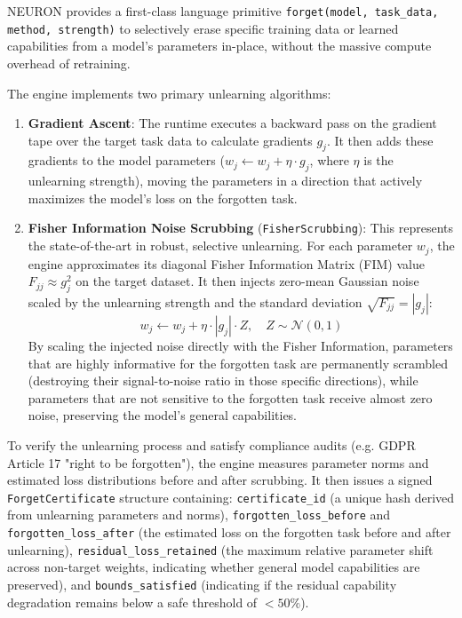\documentclass[11pt,a4paper]{article}
\begin{document}
NEURON provides a first-class language primitive \texttt{forget(model, task\_data, method, strength)} to selectively erase specific training data or learned capabilities from a model's parameters in-place, without the massive compute overhead of retraining.

The engine implements two primary unlearning algorithms:
\begin{enumerate}[itemsep=2pt]
  \item \textbf{Gradient Ascent}: The runtime executes a backward pass on the gradient tape over the target task data to calculate gradients $g_j$. It then adds these gradients to the model parameters ($w_j \leftarrow w_j + \eta \cdot g_j$, where $\eta$ is the unlearning strength), moving the parameters in a direction that actively maximizes the model's loss on the forgotten task.
  \item \textbf{Fisher Information Noise Scrubbing} (\texttt{FisherScrubbing}): This represents the state-of-the-art in robust, selective unlearning. For each parameter $w_j$, the engine approximates its diagonal Fisher Information Matrix (FIM) value $F_{jj} \approx g_j^2$ on the target dataset. It then injects zero-mean Gaussian noise scaled by the unlearning strength and the standard deviation $\sqrt{F_{jj}} = |g_j|$:
   $$w_j \leftarrow w_j + \eta \cdot |g_j| \cdot Z, \quad Z \sim \mathcal{N}(0, 1)$$
   By scaling the injected noise directly with the Fisher Information, parameters that are highly informative for the forgotten task are permanently scrambled (destroying their signal-to-noise ratio in those specific directions), while parameters that are not sensitive to the forgotten task receive almost zero noise, preserving the model's general capabilities.
\end{enumerate}

To verify the unlearning process and satisfy compliance audits (e.g. GDPR Article 17 "right to be forgotten"), the engine measures parameter norms and estimated loss distributions before and after scrubbing. It then issues a signed \texttt{ForgetCertificate} structure containing: \texttt{certificate\_id} (a unique hash derived from unlearning parameters and norms), \texttt{forgotten\_loss\_before} and \texttt{forgotten\_loss\_after} (the estimated loss on the forgotten task before and after unlearning), \texttt{residual\_loss\_retained} (the maximum relative parameter shift across non-target weights, indicating whether general model capabilities are preserved), and \texttt{bounds\_satisfied} (indicating if the residual capability degradation remains below a safe threshold of $< 50\%$).
\end{document}
